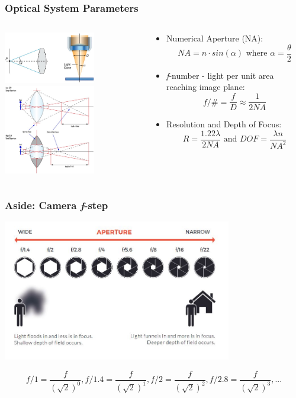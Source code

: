 \documentclass{beamer}
\begin{document}
\begin{frame}\frametitle{Optical System Parameters}
\begin{columns}
\begin{column}{4.5cm}
\begin{center}
\includegraphics[width=4cm]{fig/na.jpg}
\includegraphics[width=4cm]{fig/dof.jpg}
\end{center}
\end{column}
\begin{column}{7cm}
\begin{itemize}
\item Numerical Aperture (NA):
\[NA = n \cdot sin(\alpha) \text{ where } \alpha = \frac{\theta}{2}\]
\item \textit{f}-number - light per unit area reaching image plane:
\[ \textit{f} / \# = \frac{f}{D} \approx \frac{1}{2 NA} \]
\item Resolution and Depth of Focus:
\[ R = \frac{1.22 \lambda}{2 NA}  \text{ and } DOF = \frac{ \lambda n}{NA^2} \]
\end{itemize}
\end{column}
\end{columns}
\end{frame}

\begin{frame}\frametitle{Aside: Camera \textit{f}-step}
\begin{center}
\includegraphics[width=10cm]{fig/aperture.jpg}
\end{center}
\[ \textit{f}/1 = \frac{f}{(\sqrt{2})^0}, \textit{f}/1.4 = \frac{f}{(\sqrt{2})^1}, \textit{f}/2 = \frac{f}{(\sqrt{2})^2}, \textit{f}/2.8 = \frac{f}{(\sqrt{2})^3},...\] 
\end{frame}
\end{document}
